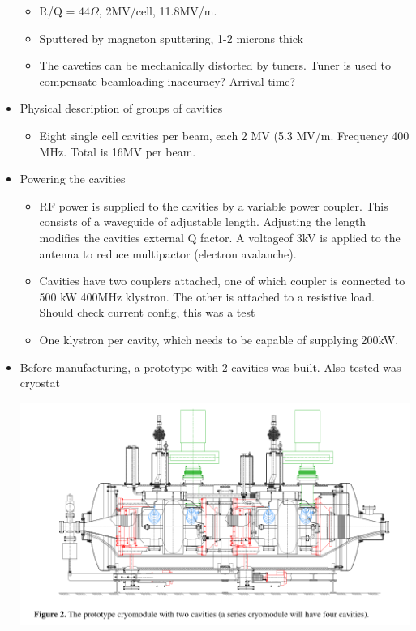 \begin{itemize}
\begin{itemize}
        \item R/Q = $44\Omega$, 2MV/cell, 11.8MV/m.  \cite{boussard}
        \item Sputtered by magneton sputtering, 1-2 microns thick  \cite{boussard}
        \item The caveties can be mechanically distorted by tuners. Tuner is used to compensate beamloading {\color{blue} inaccuracy? Arrival time?} \cite{boussard}
    \end{itemize}
    \item Physical description of groups of cavities
    \begin{itemize}\scriptsize
        \item Eight single cell cavities per beam, each 2 MV (5.3 MV/m. Frequency 400 MHz. Total is 16MV per beam. \cite{boussard}
    \end{itemize}
    \item Powering the cavities
    \begin{itemize}\scriptsize
        \item RF power is supplied to the cavities by a variable power coupler. This consists of a waveguide of adjustable length. Adjusting the length modifies the cavities external Q factor. A voltageof 3kV is applied to the antenna to reduce multipactor (electron avalanche). \cite{boussard}
        \item Cavities have two couplers attached, one of which coupler is connected to 500 kW 400MHz klystron. The other is attached to a resistive load. {\color{blue} Should check current config, this was a test} \cite{boussard}
        \item One klystron per cavity, which needs to be capable of supplying 200kW. \cite{boussard}
    \end{itemize}
    \item Before manufacturing, a prototype with 2 cavities was built. Also tested was cryostat \cite{boussard} \\
    \begin{center}
        \includegraphics[width=1\textwidth]{figures/notes-experiment/rfproto.png}
    \end{center}
\end{itemize}

